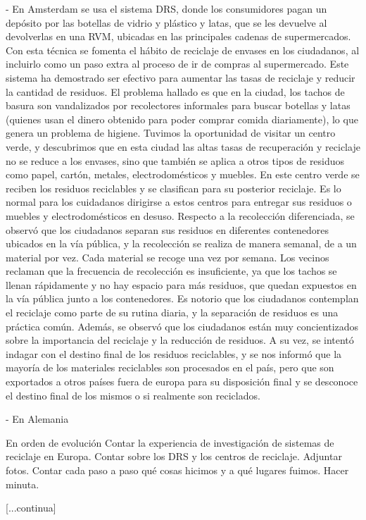 - En Amsterdam se usa el sistema DRS, donde los consumidores pagan un depósito por las botellas de vidrio y plástico y latas, que se les devuelve al devolverlas en una RVM, ubicadas en las principales cadenas de supermercados. Con esta técnica se fomenta el hábito de reciclaje de envases en los ciudadanos, al incluirlo como un paso extra al proceso de ir de compras al supermercado. Este sistema ha demostrado ser efectivo para aumentar las tasas de reciclaje y reducir la cantidad de residuos. El problema hallado es que en la ciudad, los tachos de basura son vandalizados por recolectores informales para buscar botellas y latas (quienes usan el dinero obtenido para poder comprar comida diariamente), lo que genera un problema de higiene. Tuvimos la oportunidad de visitar un centro verde, y descubrimos que en esta ciudad las altas tasas de recuperación y reciclaje no se reduce a los envases, sino que también se aplica a otros tipos de residuos como papel, cartón, metales, electrodomésticos y muebles. En este centro verde se reciben los residuos reciclables y se clasifican para su posterior reciclaje. Es lo normal para los cuidadanos dirigirse a estos centros para entregar sus residuos o muebles y electrodomésticos en desuso. Respecto a la recolección diferenciada, se observó que los ciudadanos separan sus residuos en diferentes contenedores ubicados en la vía pública, y la recolección se realiza de manera semanal, de a un material por vez. Cada material se recoge una vez por semana. Los vecinos reclaman que la frecuencia de recolección es insuficiente, ya que los tachos se llenan rápidamente y no hay espacio para más residuos, que quedan expuestos en la vía pública junto a los contenedores. Es notorio que los ciudadanos contemplan el reciclaje como parte de su rutina diaria, y la separación de residuos es una práctica común. Además, se observó que los ciudadanos están muy concientizados sobre la importancia del reciclaje y la reducción de residuos. A su vez, se intentó indagar con el destino final de los residuos reciclables, y se nos informó que la mayoría de los materiales reciclables son procesados en el país, pero que son exportados a otros países fuera de europa para su disposición final y se desconoce el destino final de los mismos o si realmente son reciclados.

- En Alemania


En orden de evolución 
Contar la experiencia de investigación de sistemas de reciclaje en Europa. Contar sobre los DRS y los centros de reciclaje. Adjuntar fotos. Contar cada paso a paso qué cosas hicimos y a qué lugares fuimos. Hacer minuta.

[...continua]

